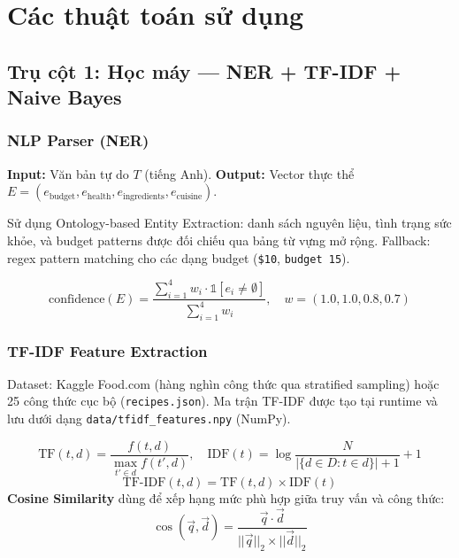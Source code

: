\section{Các thuật toán sử dụng}

\subsection{Trụ cột 1: Học máy --- NER + TF-IDF + Naive Bayes}
\label{sec:ml}

\subsubsection{NLP Parser (NER)}
\textbf{Input:} Văn bản tự do $T$ (tiếng Anh). \textbf{Output:} Vector thực thể $E = (e_{\text{budget}}, e_{\text{health}}, e_{\text{ingredients}}, e_{\text{cuisine}})$.

Sử dụng Ontology-based Entity Extraction: danh sách nguyên liệu, tình trạng sức khỏe, và budget patterns được đối chiếu qua bảng từ vựng mở rộng. Fallback: regex pattern matching cho các dạng budget (\texttt{\$10}, \texttt{budget 15}).

\begin{equation}
\text{confidence}(E) = \frac{\sum_{i=1}^{4} w_i \cdot \mathbb{1}[e_i \neq \emptyset]}{\sum_{i=1}^{4} w_i}, \quad w = (1.0, 1.0, 0.8, 0.7)
\end{equation}

\subsubsection{TF-IDF Feature Extraction}
Dataset: Kaggle Food.com (hàng nghìn công thức qua stratified sampling) hoặc 25 công thức cục bộ (\texttt{recipes.json}). Ma trận TF-IDF được tạo tại runtime và lưu dưới dạng \texttt{data/tfidf\_features.npy} (NumPy).

\begin{equation}
\text{TF}(t,d) = \frac{f(t,d)}{\max_{t' \in d} f(t',d)}, \quad
\text{IDF}(t) = \log\frac{N}{|\{d \in D : t \in d\}| + 1} + 1
\end{equation}
\begin{equation}
\text{TF-IDF}(t,d) = \text{TF}(t,d) \times \text{IDF}(t)
\end{equation}
\textbf{Cosine Similarity} dùng để xếp hạng mức phù hợp giữa truy vấn và công thức:
\begin{equation}
\cos(\vec{q}, \vec{d}) = \frac{\vec{q} \cdot \vec{d}}{||\vec{q}||_2 \times ||\vec{d}||_2}
\end{equation}

